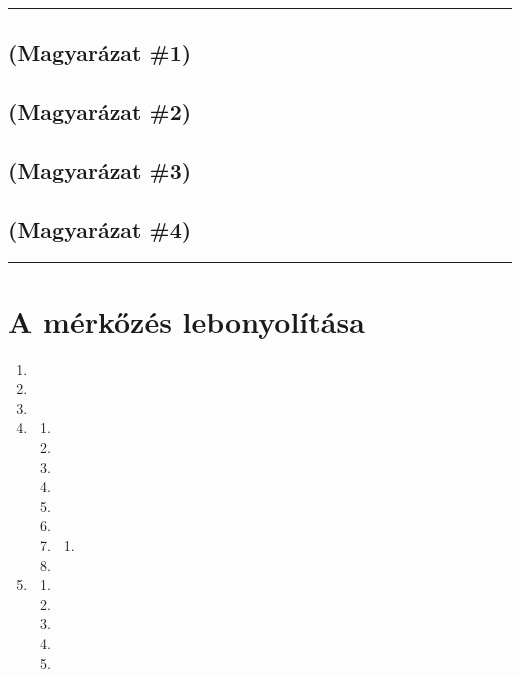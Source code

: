 \documentclass[]{report}
\newenvironment{expl}[0]%
  {\rule{\textwidth}{.2pt}\footnotesize}%
  {\rule{\textwidth}{.2pt}\normalsize}
\begin{document}
\begin{expl}
\section*{(Magyarázat \#1)}


\section*{(Magyarázat \#2)}


\section*{(Magyarázat \#3)}


\section*{(Magyarázat \#4)}

\end{expl}


\chapter{A mérkőzés lebonyolítása}

\begin{enumerate}
\item


\item


\item


\item


  \begin{enumerate}
  \item
  
  \item
  
  \item
  
  \item
  
  \item
  
  \item
  
  \item
  
    \begin{enumerate}
    \item
    
    \end{enumerate}
  \item
  
  \end{enumerate}

\item

  \begin{enumerate}
  \item
  
  \item
  
  \item
  
  \item
  
  \item
  
  \end{enumerate}

\end{enumerate}
\end{document}
